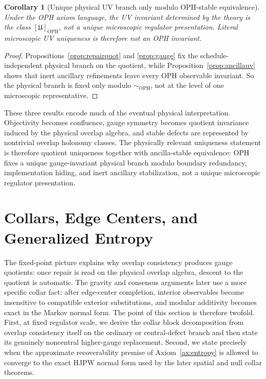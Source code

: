 \documentclass[11pt]{article}
\newtheorem{corollary}[theorem]{Corollary}
\begin{document}
\begin{corollary}[Unique physical UV branch only modulo OPH-stable equivalence]\label{cor:ophuveq}
Under the OPH axiom language, the UV invariant determined by the theory is the class \([\mathfrak U]_{\mathrm{OPH}}\), not a unique microscopic regulator presentation. Literal microscopic UV uniqueness is therefore not an OPH invariant.
\end{corollary}

\begin{proof}
Propositions~\ref{prop:repairquot} and \ref{prop:gauge} fix the schedule-independent physical
branch on the quotient, while Proposition~\ref{prop:ancillauv} shows that inert ancillary
refinements leave every OPH observable invariant. So the physical branch is fixed only modulo
\(\sim_{\mathrm{OPH}}\), not at the level of one microscopic representative.
\end{proof}

These three results encode much of the eventual physical interpretation. Objectivity becomes
confluence, gauge symmetry becomes quotient invariance induced by the physical overlap algebra, and
stable defects are represented by nontrivial overlap holonomy classes. The physically relevant
uniqueness statement is therefore quotient uniqueness together with ancilla-stable equivalence: OPH
fixes a unique gauge-invariant physical branch modulo boundary redundancy, implementation hiding,
and inert ancillary stabilization, not a unique microscopic regulator presentation.

\section{Collars, Edge Centers, and Generalized Entropy}

The fixed-point picture explains why overlap consistency produces gauge quotients: once repair is
read on the physical overlap algebra, descent to the quotient is automatic. The gravity and
consensus arguments later use a more specific collar fact: after edge-center completion, interior
observables become insensitive to compatible exterior substitutions, and modular additivity becomes
exact in the Markov normal form. The point of this section is therefore twofold. First, at fixed
regulator scale, we derive the collar block decomposition from overlap consistency itself on the
ordinary or central-defect branch and then state its genuinely noncentral higher-gauge replacement.
Second, we state precisely when the approximate recoverability premise of Axiom~\ref{ax:entropy} is
allowed to converge to the exact HJPW normal form used by the later spatial and null collar
theorems.
\end{document}
